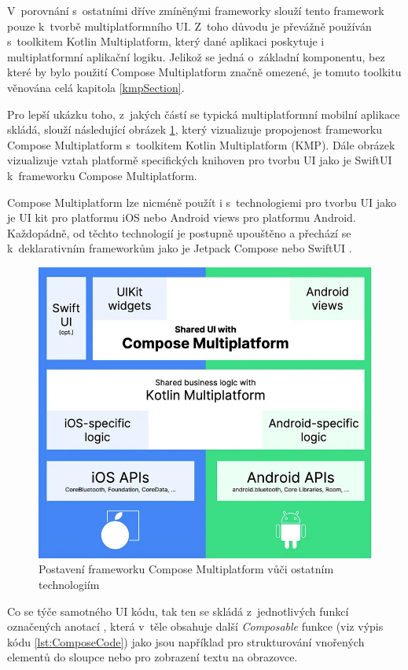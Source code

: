 V~porovnání s~ostatními dříve zmíněnými frameworky slouží tento framework pouze k~tvorbě multiplatformního UI. Z~toho důvodu je převážně 
používán s~toolkitem Kotlin Multiplatform, který dané aplikaci poskytuje i multiplatformní aplikační logiku. \cite{KMP} Jelikož se jedná o~základní 
komponentu, bez které by bylo použití Compose Multiplatform značně omezené, je tomuto toolkitu věnována celá kapitola \ref{kmpSection}.

Pro lepší ukázku toho, z~jakých částí se typická multiplatformní mobilní aplikace skládá, slouží následující obrázek \ref{fig:composeIOS}, který
vizualizuje propojenost frameworku Compose Multiplatform s~toolkitem Kotlin Multiplatform (KMP). Dále obrázek vizualizuje 
vztah platformě specifických knihoven pro tvorbu UI jako je SwiftUI k~frameworku Compose Multiplatform.

Compose Multiplatform lze nicméně použít i s~technologiemi pro tvorbu UI jako je UI kit pro platformu iOS nebo
Android views pro platformu Android. Každopádně, od těchto technologií je postupně upouštěno a přechází se k~deklarativním frameworkům jako je Jetpack Compose nebo SwiftUI \cite{declarativeUIHistory}.

\begin{figure}[H]
  \centering
  \includegraphics[width=.7\textwidth]{composeIOS.png}
  \caption{Postavení frameworku Compose Multiplatform vůči ostatním technologiím \cite{imgComposeMultiplatfromiOS}}
  \label{fig:composeIOS}
\end{figure}

Co se týče samotného UI kódu, tak ten se skládá z~jednotlivých funkcí označených anotací , která v~těle obsahuje další
\textit{Composable} funkce (viz výpis kódu \ref{lst:ComposeCode}) jako jsou například  pro strukturování vnořených elementů do sloupce nebo  pro zobrazení
textu na obrazovce. 

